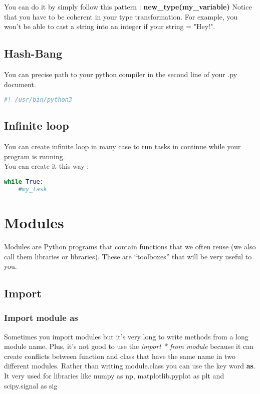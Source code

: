 \documentclass[a4paper, 12pt, titlepage]{scrartcl} %
\begin{document}
You can do it by simply follow this pattern : \textbf{new\_type(my\_variable)}
Notice that you have to be coherent in your type transformation. For example, you won't be able to cast a string into an integer if your string = "Hey!".

\subsection{Hash-Bang}
You can precise path to your python compiler in the second line of your .py document.
\begin{lstlisting}[language=Python]
#! /usr/bin/python3
\end{lstlisting} \vspace{5mm}

\subsection{Infinite loop}
\label{subsec:While}
You can create infinite loop in many case to run tasks in continue while your program is running. \\
You can create it this way :
\begin{lstlisting}[language=Python]
while True:
    #my_task
\end{lstlisting} \vspace{5mm}

\newpage
\section{Modules}
Modules are Python programs that contain functions that we often reuse (we also call them libraries or libraries). These are “toolboxes” that will be very useful to you.

\subsection{Import}
\label{subsec:Import}

\subsubsection{Import module as}
\label{As}
Sometimes you import modules but it's very long to write methods from a long module name. Plus, it's not good to use the \textit{import * from module} because it can create conflicts between function and class that have the same name in two different modules. Rather than writing module.class you can use the key word \textbf{as}. It very used for libraries like numpy as np, matplotlib.pyplot as plt and scipy.signal as sig
\end{document}
